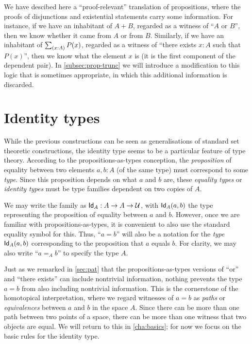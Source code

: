 We have descibed here a ``proof-relevant'' translation of propositions, where the proofs of disjunctions and existential statements carry some information.
For instance, if we have an inhabitant of $A+B$, regarded as a witness of ``$A$ or $B$'', then we know whether it came from $A$ or from $B$.
Similarly, if we have an inhabitant of $\sm{x:A} P(x)$, regarded as a witness of ``there exists $x:A$ such that $P(x)$'', then we know what the element $x$ is (it is the first component of the dependent pair).
In \autoref{subsec:prop-trunc} we will introduce a modification to this logic that is sometimes appropriate, in which this additional information is discarded.

\section{Identity types}
\label{sec:identity-types}

While the previous constructions can be seen as generalisations of
standard set theoretic constructions, the identity type seems to be
a particular feature of type theory.
According to the propositions-as-types conception, the \emph{proposition} of equality between two elements $a,b:A$ (of the same type) must correspond to some \emph{type}.
Since this proposition depends on what $a$ and $b$ are, these \emph{equality types} or \emph{identity types} must be type families dependent on two copies of $A$.

We may write the family as $\idtypevar{A}:A\to A\to\type$, with $\idtype[A]ab$ the type representing the proposition of equality between $a$ and $b$.
However, once we are familiar with propositions-as-types, it is convenient to also use the standard equality symbol for this.
Thus, ``$a=b$'' will also be a notation for the \emph{type} $\idtype[A]ab$ corresponding to the proposition that $a$ equals $b$.
For clarity, we may also write ``$a=_A b$'' to specify the type $A$.

Just as we remarked in \autoref{sec:pat} that the propositions-as-types versions of ``or'' and ``there exists'' can include nontrivial information, nothing prevents the type $a=b$ from also including nontrivial information.
This is the cornerstone of the homotopical interpretation, where we regard witnesses of $a=b$ as \emph{paths} or \emph{equivalences} between $a$ and $b$ in the space $A$.
Since there can be more than one path between two points of a space, there can be more than one witness that two objects are equal.
We will return to this in \autoref{cha:basics}; for now we focus on the basic rules for the identity type.

